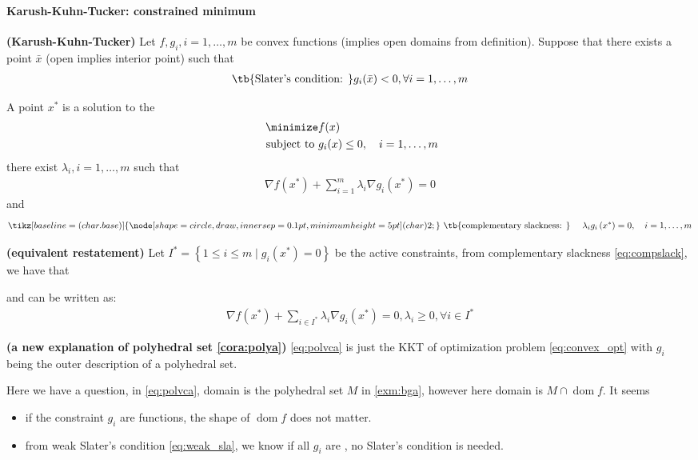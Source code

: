 \documentclass{article}
\newcommand{\bfs}[1]{\textbf{({#1}) }}
\newcommand*\circled[1]{\tikz[baseline=(char.base)]{
    \node[shape=circle, draw, inner sep=0.1pt, 
        minimum height=5pt] (char) {\vphantom{1g}#1};}}
\newcommand{\dom}{\operatorname{dom}}
\begin{document}
\paragraph{Karush-Kuhn-Tucker: constrained minimum}
\begin{thma}\bfs{Karush-Kuhn-Tucker}\label{thm:kkt}
Let $f, g_{i}, i=1, \ldots, m$ be  convex functions (implies open domains from definition). Suppose that there exists a point $\bar{x}$ (open implies interior point) such that
\begin{align*}
   \text{\tb{Slater's condition: }} g_{i}(\bar{x})<0, \forall i=1, \ldots, m
\end{align*}

A point $x^{*}$ is a solution to the 
\begin{align}
 \minimize & f(x) \label{eq:convex_opt}\\
\text { subject to } & g_{i}(x) \leq 0, \quad i=1, \ldots, m \nonumber
\end{align}
 \circled{1} there exist  $\lambda_{i}, i=1, \ldots, m$ such that
\begin{align}
\nabla f\left(x^{*}\right)+\sum_{i=1}^{m} \lambda_{i} \nabla g_{i}\left(x^{*}\right)=0 \label{eq:kkt}
\end{align}
and
\begin{align}
\circled{2} \text { \tb{complementary slackness: } } \quad \lambda_{i} g_{i}\left(x^{*}\right)=0, \quad i=1, \ldots, m \label{eq:compslack}
\end{align}
\end{thma}
\begin{rema}\bfs{equivalent restatement}\label{rem:eqktt}
Let $I^{*}=\left\{1 \leq i \leq m \mid g_{i}\left(x^{*}\right)=0\right\}$ be the active constraints, from complementary slackness \cref{eq:compslack}, we have that  

\circled{1} and \circled{2} can be written as:
\begin{align}
\nabla f\left(x^{*}\right)+\sum_{i\in I^{*}} \lambda_{i} \nabla g_{i}\left(x^{*}\right)=0,  \lambda_{i}\ge 0, \forall i\in I^{*} \label{eq:kkt1}
\end{align}
\end{rema}
\begin{rema}\bfs{a new explanation of polyhedral set \cref{cora:polya}}\label{rem:guaue}
\cref{eq:polvca} is just the KKT of optimization problem \cref{eq:convex_opt} with $g_i$ being the outer description of a polyhedral set. 

Here we have a question, in \cref{eq:polvca}, domain is the polyhedral set $M$ in \cref{exm:bga}, however here domain is $M\cap \dom f$. It seems 
\begin{itemize}
    \item if the constraint $g_i$ are  functions, the shape of $\dom f$ does not matter.
    \item from weak Slater’s condition \cref{eq:weak_sla}, we know if all $g_i$ are , no  Slater’s condition is needed. 
\end{itemize}
\end{rema}
\end{document}
